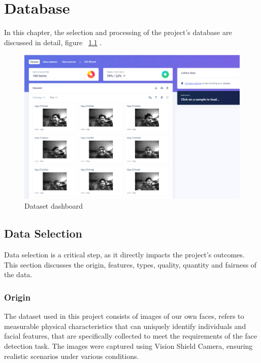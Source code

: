 
%
%
%
%

\chapter{Database}
In this chapter, the selection and processing of the project’s database are discussed in detail, figure ~\ref{DatasetDashboard} \cite{IEEE:1997}. %
\begin{figure}
	\begin{center}
		\includegraphics[width=0.7\linewidth]{Images/EdgeImpulse/Database.png}
		\caption{Dataset dashboard}
		\label{DatasetDashboard}
	\end{center}
\end{figure}

\section{Data Selection}
Data selection is a critical step, as it directly impacts the project’s outcomes. This section discusses the origin, features, types, quality, quantity and fairness of the data.

\subsection{Origin}
The dataset used in this project consists of images of our own faces, refers to measurable physical characteristics that can uniquely identify individuals and facial features, that are specifically collected to meet the requirements of the face detection task. The images were captured using Vision Shield Camera, ensuring realistic scenarios under various conditions.

